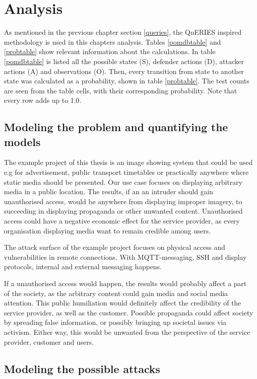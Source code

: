 \chapter{Analysis} \label{analysis}

As mentioned in the previous chapter section
\ref{queries}, the QuERIES inspired methodology is used in this
chapters analysis. Tables \ref{pomdbtable} and \ref{probtable} show
relevant information about the calculations. In table \ref{pomdbtable}
is listed all the possible states (S), defender actions (D), attacker
actions (A) and observations (O). Then, every transition from state to
another state was calculated as a probability, shown in table
\ref{probtable}. The test counts are seen from the table cells, with
their corresponding probability. Note that every row adds up to 1.0.

\section{Modeling the problem and quantifying the models} \label{modprob}

The example project of this thesis is an image showing system that
could be used e.g for advertisement, public transport timetables or
practically anywhere where static media should be presented. Our use
case focuses on displaying arbitrary media in a public location. The
results, if an an intruder should gain unauthorised access, would be
anywhere from displaying improper imagery, to succeeding in displaying
propaganda or other unwanted content. Unauthorised access could have a
negative economic effect for the service provider, as every
organisation displaying media want to remain credible among users.

The attack surface of the example project focuses on physical access
and vulnerabilities in remote connections. With MQTT-messaging, SSH
and display protocols, internal and external messaging
happens.

If a unauthorised access would happen, the results would probably
affect a part of the society, as the arbitrary content could gain
media and social media attention. This public humiliation would
definitely affect the credibility of the service provider, as well as
the customer. Possible propaganda could affect society by spreading
false information, or possibly bringing up societal issues via
activism. Either way, this would be unwanted from the perspective of
the service provider, customer and users.

\section{Modeling the possible attacks}

